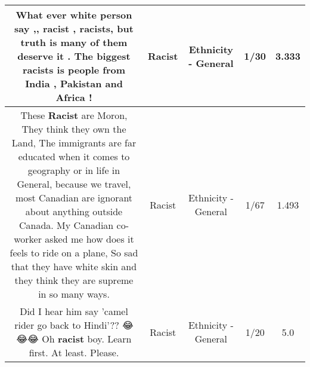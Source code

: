 \documentclass[11pt]{article}
\newlength\mylength
\begin{document}
\begin{center}
\begin{longtable}{|C{.65\mylength}|C{.30\mylength}|C{.12\mylength}|C{.12\mylength}|C{.12\mylength}|}
  \small What ever white person say ,, \textbf{racist} , racists, but truth is many of them deserve it . The biggest racists is people from India , Pakistan and Africa !\normalsize   & Racist & Ethnicity - General & 1/30 & 3.333 \\  \hline
  \small These \textbf{Racist} are Moron, They think they own the Land, The immigrants are far educated when it comes to geography or in life in General, because we travel, most Canadian are ignorant about anything outside Canada. My Canadian co-worker asked me how does it feels to ride on a plane, So sad that they have white skin and they think they are supreme in so many ways.\normalsize   & Racist & Ethnicity - General & 1/67 & 1.493 \\  \hline
  \small Did I hear him say 'camel rider go back to Hindi'?? 😂😂😂 Oh \textbf{racist} boy. Learn first. At least. Please.\normalsize   & Racist & Ethnicity - General & 1/20 & 5.0 \\  \hline

\end{longtable}
\end{center}
\end{document}
